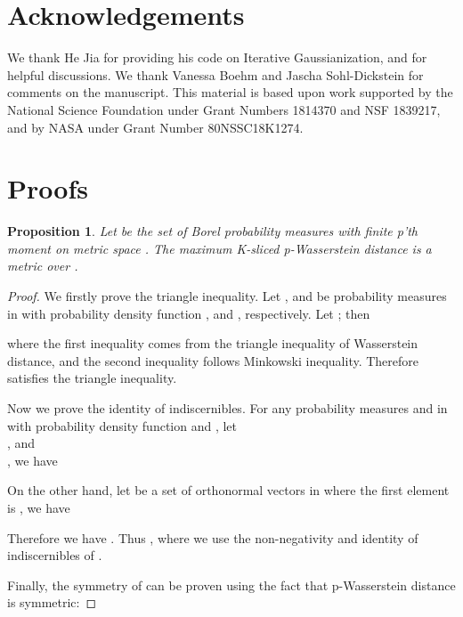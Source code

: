 \documentclass{article}
\newtheorem{prop}{Proposition}
\begin{document}
\section*{Acknowledgements}

We thank He Jia for providing his code on Iterative Gaussianization, and for helpful discussions. We thank Vanessa Boehm and Jascha Sohl-Dickstein for comments on the manuscript. This material is based upon work supported by the National Science Foundation under Grant Numbers 1814370 and NSF 1839217, and by NASA under Grant Number 80NSSC18K1274. 








\newpage

\appendix



\section{Proofs}
\begin{prop}
\label{prop:max-K-SWD}
Let  be the set of Borel probability measures with finite p’th moment on metric space . The maximum K-sliced p-Wasserstein distance is a metric over .
\end{prop}

\begin{proof}
We firstly prove the triangle inequality.
Let ,  and  be probability measures in  with probability density function ,  and , respectively. 
Let ; then

where the first inequality comes from the triangle inequality of Wasserstein distance, and the second inequality follows Minkowski inequality. Therefore  satisfies the triangle inequality.

Now we prove the identity of indiscernibles. For any probability measures  and  in  with probability density function  and , let \\
, and\\
, we have

On the other hand, let  be a set of orthonormal vectors in  where the first element is , we have 

Therefore we have . Thus , where we use the non-negativity and identity of indiscernibles of .

Finally, the symmetry of  can be proven using the fact that p-Wasserstein distance is symmetric:

\end{proof}
\end{document}
